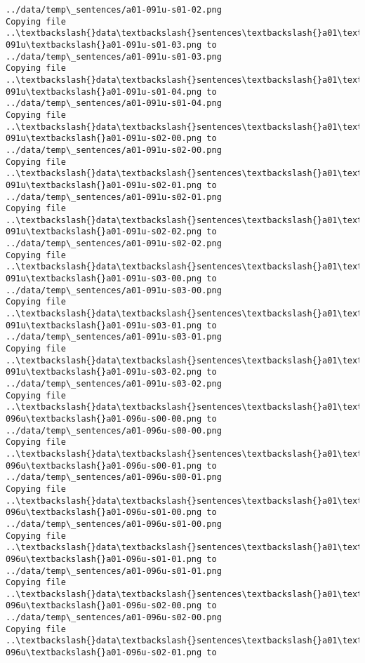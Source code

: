 \documentclass[11pt]{article}
\begin{document}
\begin{Verbatim}[commandchars=\\\{\}]
../data/temp\_sentences/a01-091u-s01-02.png
Copying file ..\textbackslash{}data\textbackslash{}sentences\textbackslash{}a01\textbackslash{}a01-091u\textbackslash{}a01-091u-s01-03.png to
../data/temp\_sentences/a01-091u-s01-03.png
Copying file ..\textbackslash{}data\textbackslash{}sentences\textbackslash{}a01\textbackslash{}a01-091u\textbackslash{}a01-091u-s01-04.png to
../data/temp\_sentences/a01-091u-s01-04.png
Copying file ..\textbackslash{}data\textbackslash{}sentences\textbackslash{}a01\textbackslash{}a01-091u\textbackslash{}a01-091u-s02-00.png to
../data/temp\_sentences/a01-091u-s02-00.png
Copying file ..\textbackslash{}data\textbackslash{}sentences\textbackslash{}a01\textbackslash{}a01-091u\textbackslash{}a01-091u-s02-01.png to
../data/temp\_sentences/a01-091u-s02-01.png
Copying file ..\textbackslash{}data\textbackslash{}sentences\textbackslash{}a01\textbackslash{}a01-091u\textbackslash{}a01-091u-s02-02.png to
../data/temp\_sentences/a01-091u-s02-02.png
Copying file ..\textbackslash{}data\textbackslash{}sentences\textbackslash{}a01\textbackslash{}a01-091u\textbackslash{}a01-091u-s03-00.png to
../data/temp\_sentences/a01-091u-s03-00.png
Copying file ..\textbackslash{}data\textbackslash{}sentences\textbackslash{}a01\textbackslash{}a01-091u\textbackslash{}a01-091u-s03-01.png to
../data/temp\_sentences/a01-091u-s03-01.png
Copying file ..\textbackslash{}data\textbackslash{}sentences\textbackslash{}a01\textbackslash{}a01-091u\textbackslash{}a01-091u-s03-02.png to
../data/temp\_sentences/a01-091u-s03-02.png
Copying file ..\textbackslash{}data\textbackslash{}sentences\textbackslash{}a01\textbackslash{}a01-096u\textbackslash{}a01-096u-s00-00.png to
../data/temp\_sentences/a01-096u-s00-00.png
Copying file ..\textbackslash{}data\textbackslash{}sentences\textbackslash{}a01\textbackslash{}a01-096u\textbackslash{}a01-096u-s00-01.png to
../data/temp\_sentences/a01-096u-s00-01.png
Copying file ..\textbackslash{}data\textbackslash{}sentences\textbackslash{}a01\textbackslash{}a01-096u\textbackslash{}a01-096u-s01-00.png to
../data/temp\_sentences/a01-096u-s01-00.png
Copying file ..\textbackslash{}data\textbackslash{}sentences\textbackslash{}a01\textbackslash{}a01-096u\textbackslash{}a01-096u-s01-01.png to
../data/temp\_sentences/a01-096u-s01-01.png
Copying file ..\textbackslash{}data\textbackslash{}sentences\textbackslash{}a01\textbackslash{}a01-096u\textbackslash{}a01-096u-s02-00.png to
../data/temp\_sentences/a01-096u-s02-00.png
Copying file ..\textbackslash{}data\textbackslash{}sentences\textbackslash{}a01\textbackslash{}a01-096u\textbackslash{}a01-096u-s02-01.png to

\end{Verbatim}
\end{document}
